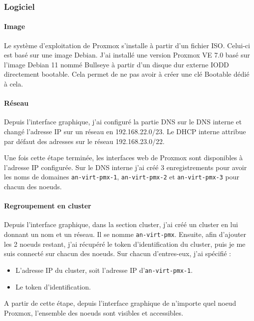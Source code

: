 \documentclass[12pt]{article}
\begin{document}
\subsubsection{Logiciel}
\paragraph{Image}
Le système d'exploitation de Proxmox s'installe à partir d'un fichier ISO. Celui-ci est basé sur une image Debian. J'ai installé une version Proxmox VE 7.0 basé sur l'image Debian 11 nommé Bullseye à partir d'un disque dur externe IODD directement bootable. Cela permet de ne pas avoir à créer une clé Bootable dédié à cela.

\paragraph{Réseau}
Depuis l'interface graphique, j'ai configuré la partie DNS sur le DNS interne et changé l'adresse IP sur un réseau en 192.168.22.0/23. Le DHCP interne attribue par défaut des adresses sur le réseau 192.168.23.0/22.

Une fois cette étape terminée, les interfaces web de Proxmox sont disponibles à l'adresse IP configurée. Sur le DNS interne j'ai créé 3 enregistrements pour avoir les noms de domaines \verb|an-virt-pmx-1|, \verb|an-virt-pmx-2| et \verb|an-virt-pmx-3| pour chacun des noeuds.

\paragraph{Regroupement en cluster}
Depuis l'interface graphique, dans la section cluster, j'ai créé un cluster en lui donnant un nom et un réseau. Il se nomme \verb|an-virt-pmx|.
Ensuite, afin d'ajouter les 2 noeuds restant, j'ai récupéré le token d'identification du cluster, puis je me suis connecté sur chacun des noeuds. Sur chacun d'entres-eux, j'ai spécifié :
\begin{itemize}
    \item L'adresse IP du cluster, soit l'adresse IP d'\verb|an-virt-pmx-1|.
    \item Le token d'identification.
\end{itemize}

A partir de cette étape, depuis l'interface graphique de n'importe quel noeud Proxmox, l'ensemble des noeuds sont visibles et accessibles.
\end{document}
